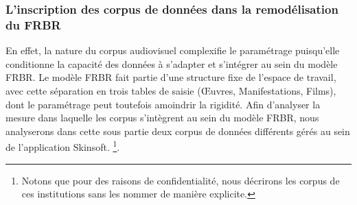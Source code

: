 











\subsubsection{L'inscription des corpus de données dans la remodélisation du FRBR} 

En effet, la nature du corpus audiovisuel complexifie le paramétrage puisqu'elle conditionne la capacité des données à s'adapter et s'intégrer au sein du modèle FRBR. Le modèle FRBR fait partie d'une structure fixe de l'espace de travail, avec cette séparation en trois tables de saisie (Œuvres, Manifestations, Films), dont le paramétrage peut toutefois amoindrir la rigidité. Afin d'analyser la mesure dans laquelle les corpus s'intègrent au sein du modèle FRBR, nous analyserons dans cette sous partie deux corpus de données différents gérés au sein de l’application Skinsoft. \footnote{Notons que pour des raisons de confidentialité, nous décrirons les corpus de ces institutions sans les nommer de manière explicite.}.  


